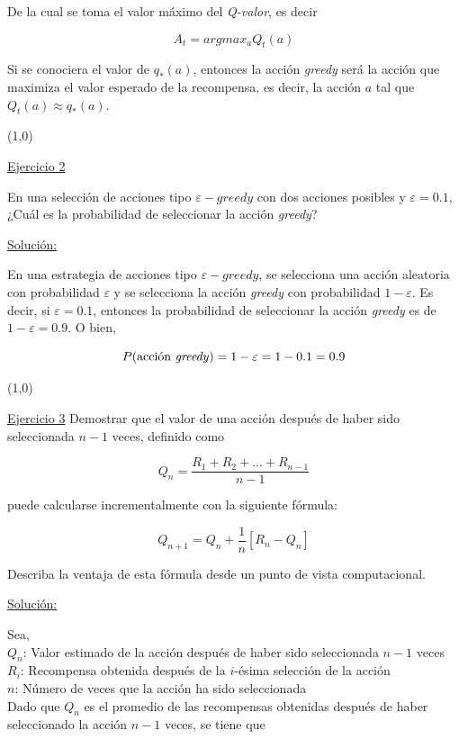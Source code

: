 \documentclass[12pt]{article}
\newlength\tindent
\renewcommand{\indent}{\hspace*{\tindent}}
\begin{document}
    De la cual se toma el valor máximo del \textit{Q-valor}, es decir

    \[
        A_{t} = argmax_{a}Q_{t}(a)
    \]

    Si se conociera el valor de $q_{*}(a)$, entonces la acción \textit{greedy} será la acción que maximiza el valor esperado de la recompensa, es decir, la acción $a$ tal que $Q_{t}(a) \approx q_{*}(a)$.

    \line(1,0){\textwidth}

    \indent\underline{Ejercicio 2}

    En una selección de acciones tipo $\varepsilon-greedy$ con dos acciones posibles y $\varepsilon=0.1$, ¿Cuál es la probabilidad de seleccionar la acción \textit{greedy}?

    \indent\underline{Solución:}

    En una estrategia de acciones tipo $\varepsilon-greedy$, se selecciona una acción aleatoria con probabilidad $\varepsilon$ y se selecciona la acción \textit{greedy} con probabilidad $1-\varepsilon$.
    Es decir, si $\varepsilon=0.1$, entonces la probabilidad de seleccionar la acción \textit{greedy} es de $1-\varepsilon=0.9$.
    O bien,

    \[P(\text{acción \textit{greedy}}) = 1-\varepsilon = 1 - 0.1 = 0.9\]

    \line(1,0){\textwidth}

    \indent\underline{Ejercicio 3}
    Demostrar que el valor de una acción después de haber sido seleccionada $n-1$ veces, definido como

    \[ Q_{n} = \frac{R_{1} + R_{2} + \ldots + R_{n-1}}{n-1} \]

    puede calcularse incrementalmente con la siguiente fórmula:

    \[ Q_{n+1} = Q_{n} + \frac{1}{n} \left[ R_{n} - Q_{n} \right] \]

    Describa la ventaja de esta fórmula desde un punto de vista computacional.

    \indent\underline{Solución:}

    Sea,\\
    $Q_{n}$: Valor estimado de la acción después de haber sido seleccionada $n-1$ veces \\
    $R_i$: Recompensa obtenida después de la $i$-ésima selección de la acción \\
    $n$: Número de veces que la acción ha sido seleccionada \\

    Dado que $Q_{n}$ es el promedio de las recompensas obtenidas después de haber seleccionado la acción $n-1$ veces, se tiene que
\end{document}
